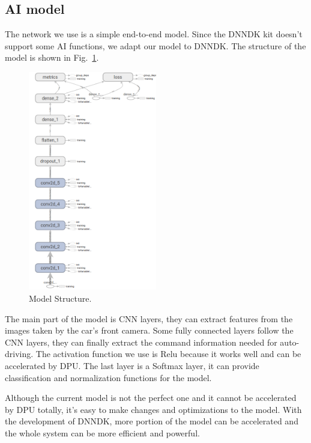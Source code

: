 \documentclass[conference]{IEEEtran}
\begin{document}
\subsection{AI model}

The network we use is a simple end-to-end model. Since the DNNDK kit doesn't support some AI functions, we adapt our model to DNNDK. The structure of the model is shown in Fig.~\ref{ms}.  

\begin{figure}[htbp]
\centerline{\includegraphics[width=0.5\textwidth]{net-structure.png}}
\caption{Model Structure.}
\label{ms}
\end{figure}

The main part of the model is CNN layers, they can extract features from the images taken by the car's front camera. Some fully connected layers follow the CNN layers, they can finally extract the command information needed for auto-driving. The activation function we use is Relu because it works well and can be accelerated by DPU. The last layer is a Softmax layer, it can provide classification and normalization functions for the model.  

Although the current model is not the perfect one and it cannot be accelerated by DPU totally, it's easy to make changes and optimizations to the model. With the development of DNNDK, more portion of the model can be accelerated and the whole system can be more efficient and powerful.
\end{document}
